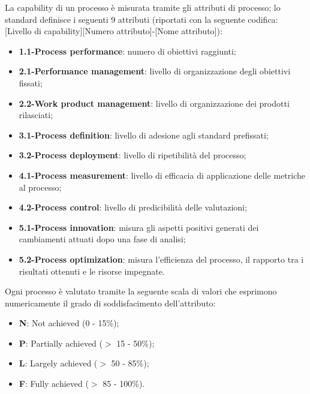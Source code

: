 La capability di un processo è misurata tramite gli attributi di processo; lo standard definisce i seguenti 9 attributi
(riportati con la seguente codifica: [Livello di capability][Numero attributo]-[Nome attributo]):
\begin{itemize}
	\item \textbf{1.1-Process performance}: numero di obiettivi raggiunti;
	\item \textbf{2.1-Performance management}: livello di organizzazione degli obiettivi fissati;
	\item \textbf{2.2-Work product management}: livello di organizzazione dei prodotti rilasciati;
	\item \textbf{3.1-Process definition}: livello di adesione agli standard prefissati;
	\item \textbf{3.2-Process deployment}: livello di ripetibilità del processo;
	\item \textbf{4.1-Process measurement}: livello di efficacia di applicazione delle metriche al processo;
	\item \textbf{4.2-Process control}: livello di predicibilità delle valutazioni;
	\item \textbf{5.1-Process innovation}: misura gli aspetti positivi generati dei cambiamenti attuati dopo una
	fase di analisi;
	\item \textbf{5.2-Process optimization}: misura l'efficienza del processo, il rapporto tra i risultati ottenuti e
	le risorse impegnate.
\end{itemize}

Ogni processo è valutato tramite la seguente scala di valori che esprimono numericamente il grado di
soddisfacimento dell'attributo:
\begin{itemize}
	\item \textbf{N}: Not achieved (0 - 15\%);
	\item \textbf{P}: Partially achieved ($>$ 15 - 50\%);
	\item \textbf{L}: Largely achieved ($>$ 50 - 85\%);
	\item \textbf{F}: Fully achieved ($>$ 85 - 100\%).
\end{itemize}